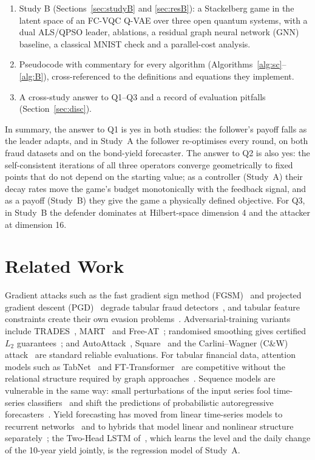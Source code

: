 \documentclass[conference]{IEEEtran}
\begin{document}
\begin{enumerate}
\item Study B (Sections~\ref{sec:studyB} and \ref{sec:resB}): a Stackelberg game in the latent space of an FC-VQC Q-VAE over three open quantum systems, with a dual ALS/QPSO leader, ablations, a residual graph neural network (GNN) baseline, a classical MNIST check and a parallel-cost analysis.
\item Pseudocode with commentary for every algorithm (Algorithms~\ref{alg:sc}--\ref{alg:B}), cross-referenced to the definitions and equations they implement.
\item A cross-study answer to Q1--Q3 and a record of evaluation pitfalls (Section~\ref{sec:disc}).
\end{enumerate}

In summary, the answer to Q1 is yes in both studies: the follower's payoff falls as the leader adapts, and in Study~A the follower re-optimises every round, on both fraud datasets and on the bond-yield forecaster. The answer to Q2 is also yes: the self-consistent iterations of all three operators converge geometrically to fixed points that do not depend on the starting value; as a controller (Study~A) their decay rates move the game's budget monotonically with the feedback signal, and as a payoff (Study~B) they give the game a physically defined objective. For Q3, in Study~B the defender dominates at Hilbert-space dimension 4 and the attacker at dimension 16.

\section{Related Work}
Gradient attacks such as the fast gradient sign method (FGSM)~\cite{goodfellow2015} and projected gradient descent (PGD)~\cite{madry2018} degrade tabular fraud detectors~\cite{cartella2021}, and tabular feature constraints create their own evasion problems~\cite{simonetto2024}. Adversarial-training variants include TRADES~\cite{zhang2019trades}, MART~\cite{wang2020mart} and Free-AT~\cite{shafahi2019}; randomised smoothing gives certified $L_2$ guarantees~\cite{cohen2019}; and AutoAttack~\cite{croce2020}, Square~\cite{andriushchenko2020} and the Carlini--Wagner (C\&W) attack~\cite{carlini2017} are standard reliable evaluations. For tabular financial data, attention models such as TabNet~\cite{arik2021} and FT-Transformer~\cite{gorishniy2021} are competitive without the relational structure required by graph approaches~\cite{cheng2022}. Sequence models are vulnerable in the same way: small perturbations of the input series fool time-series classifiers~\cite{fawaz2019adv} and shift the predictions of probabilistic autoregressive forecasters~\cite{dangnhu2020}. Yield forecasting has moved from linear time-series models to recurrent networks~\cite{hochreiter1997} and to hybrids that model linear and nonlinear structure separately~\cite{zhang2003hybrid}; the Two-Head LSTM of~\cite{pilaka2026bond}, which learns the level and the daily change of the 10-year yield jointly, is the regression model of Study~A.
\end{document}
